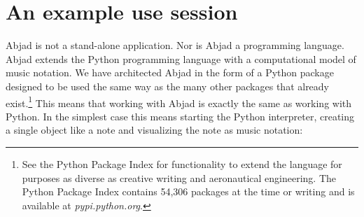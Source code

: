 \documentclass{article}
\begin{document}

\section{An example use session} \label{sec:example}

Abjad is not a stand-alone application. Nor is Abjad a programming language.
Abjad extends the Python programming language with a computational model of
music notation. We have architected Abjad in the form of a Python package
designed to be used the same way as the many other packages that already
exist.\footnote{See the Python Package Index for functionality to extend the
language for purposes as diverse as creative writing and aeronautical
engineering. The Python Package Index contains 54,306 packages at the time or
writing and is available at \textit{pypi.python.org}.} This means that working
with Abjad is exactly the same as working with Python. In the simplest case
this means starting the Python interpreter, creating a single object like a
note and visualizing the note as music notation:
\end{document}
